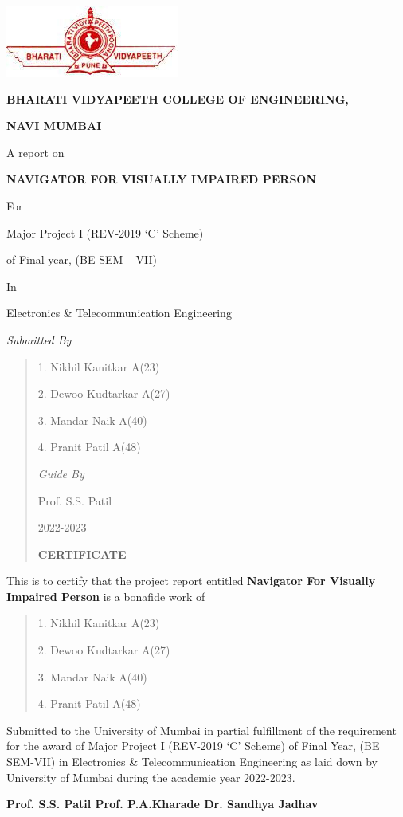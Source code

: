 \documentclass{article}
\begin{document}
\includegraphics[width=2.23958in,height=0.91667in]{media/image1.jpg}

\textbf{BHARATI VIDYAPEETH COLLEGE OF ENGINEERING,}

\textbf{NAVI MUMBAI}

A report on

\textbf{NAVIGATOR FOR VISUALLY IMPAIRED PERSON}

For

Major Project I (REV-2019 `C' Scheme)

of Final year, (BE SEM -- VII)

In

Electronics \& Telecommunication Engineering

\emph{Submitted By}

\begin{quote}
1. Nikhil Kanitkar A(23)

2. Dewoo Kudtarkar A(27)

3. Mandar Naik A(40)

4. Pranit Patil A(48)

\emph{Guide By}

Prof. S.S. Patil

2022-2023

\textbf{CERTIFICATE}
\end{quote}

This is to certify that the project report entitled \textbf{Navigator
For Visually Impaired Person} is a bonafide work of

\begin{quote}
1. Nikhil Kanitkar A(23)

2. Dewoo Kudtarkar A(27)

3. Mandar Naik A(40)

4. Pranit Patil A(48)
\end{quote}

Submitted to the University of Mumbai in partial fulfillment of the
requirement for the award of Major Project I (REV-2019 `C' Scheme) of
Final Year, (BE SEM-VII) in Electronics \& Telecommunication Engineering
as laid down by University of Mumbai during the academic year 2022-2023.

\textbf{Prof. S.S. Patil Prof. P.A.Kharade Dr. Sandhya Jadhav}
\end{document}
